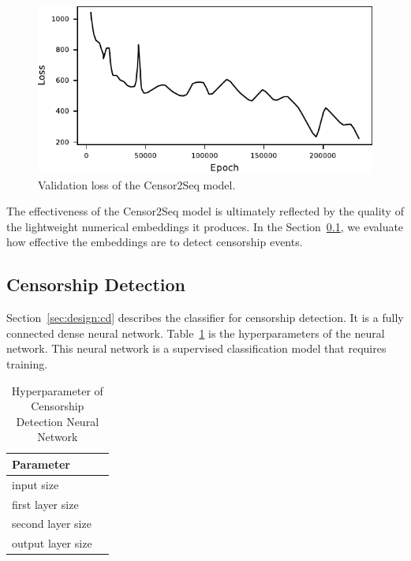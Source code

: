\begin{figure}[!htbp]
    \centering
    \includegraphics[width=0.8\columnwidth]{figures/autoencoder_val_loss.pdf}
    \caption{Validation loss of the Censor2Seq model.}
    \label{fig:ae_val_loss}
\end{figure}


The effectiveness of the Censor2Seq model is ultimately  reflected by the quality of
the lightweight numerical embeddings it produces.  In the Section~\ref{sec:eval:cd}, we evaluate how
effective the embeddings are to detect censorship events. 

\subsection{Censorship Detection}
\label{sec:eval:cd}

Section~\ref{sec:design:cd} describes the classifier for censorship detection.
It is a fully connected dense neural network. Table~\ref{tab:cd:params} is
the hyperparameters of the neural network. 
This neural network is a supervised classification model that requires
training.


\begin{table}[h]
	\centering
  \caption{Hyperparameter of Censorship Detection Neural Network}
  \label{tab:cd:params}
  \begin{tabular}{p{} r}
    \toprule
    Parameter & \\
    \midrule
    input size & \CDinputsize \\ 
    first layer size & \CDfirstsize \\
    second layer size & \CDsecondsize \\
		output layer size & \CDoutputsize\\
    \bottomrule
  \end{tabular}
\end{table}


